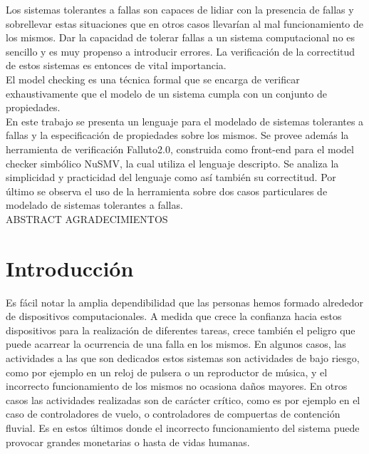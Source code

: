 \documentclass[titlepage, 12pt]{book}
\begin{document}
Los sistemas tolerantes a fallas son capaces de lidiar con la presencia de fallas y sobrellevar estas situaciones que en otros casos llevar\'ian al mal funcionamiento de los mismos. Dar la capacidad de tolerar fallas a un sistema computacional no es sencillo y es muy propenso a introducir errores. La verificaci\'on de la correctitud de estos sistemas es entonces de vital importancia.\\


El model checking es una t\'ecnica formal que se encarga de verificar exhaustivamente que el modelo de un sistema cumpla con un conjunto de propiedades.\\

En este trabajo se presenta un lenguaje para el modelado de sistemas tolerantes a fallas y la especificaci\'on de propiedades sobre los mismos. Se provee adem\'as la herramienta de verificaci\'on Falluto2.0, construida como front-end para el model checker simb\'olico NuSMV, la cual utiliza el lenguaje descripto. Se analiza la simplicidad y practicidad del lenguaje como as\'i tambi\'en su correctitud. Por \'ultimo se observa el uso de la herramienta sobre dos casos particulares de modelado de sistemas tolerantes a fallas.\\

 
\newpage
ABSTRACT
\newpage
AGRADECIMIENTOS

\newpage
\tableofcontents

\newpage


\chapter{Introducci\'on}
\label{introduccion}

Es f\'acil notar la amplia dependibilidad que las personas hemos formado alrededor de dispositivos computacionales. A medida que crece la confianza hacia estos dispositivos para la realizaci\'on de diferentes tareas, crece tambi\'en el peligro que puede acarrear la ocurrencia de una falla en los mismos. En algunos casos, las actividades a las que son dedicados estos sistemas son actividades de bajo riesgo, como por ejemplo en un reloj de pulsera o un reproductor de m\'usica, y el incorrecto funcionamiento de los mismos no ocasiona da\~nos mayores. En otros casos las actividades realizadas son de car\'acter cr\'itico, como es por ejemplo en el caso de controladores de vuelo, o controladores de compuertas de contenci\'on fluvial. Es en estos \'ultimos donde el incorrecto funcionamiento del sistema puede provocar grandes monetarias o hasta de vidas humanas.\\
\end{document}
